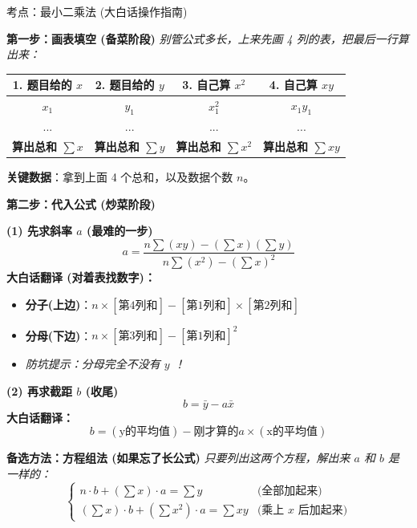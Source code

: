 \documentclass[12pt, a4paper]{article}
\begin{document}
\begin{knowpoint}{考点：最小二乘法 (大白话操作指南)}

    \textbf{第一步：画表填空 (备菜阶段)}
    \textit{别管公式多长，上来先画 4 列的表，把最后一行算出来：}
    
    \begin{center}
    \begin{tabular}{|c|c|c|c|}
    \hline
    \textbf{1. 题目给的 $x$} & \textbf{2. 题目给的 $y$} & \textbf{3. 自己算 $x^2$} & \textbf{4. 自己算 $xy$} \\
    \hline
    $x_1$ & $y_1$ & $x_1^2$ & $x_1 y_1$ \\
    ... & ... & ... & ... \\
    \hline
    \textbf{算出总和 $\sum x$} & \textbf{算出总和 $\sum y$} & \textbf{算出总和 $\sum x^2$} & \textbf{算出总和 $\sum xy$} \\
    \hline
    \end{tabular}
    \end{center}
    \vspace{0.5em}
    \textbf{关键数据}：拿到上面 4 个总和，以及数据个数 $n$。

    \vspace{1.0em}
    \textbf{第二步：代入公式 (炒菜阶段)}
    
    \textbf{(1) 先求斜率 $a$ (最难的一步)}
    \[ a = \frac{n \sum (xy) - (\sum x)(\sum y)}{n \sum (x^2) - (\sum x)^2} \]
    \textbf{大白话翻译 (对着表找数字)：}
    \begin{itemize}
        \item \textbf{分子(上边)}：$n \times [\text{第4列和}] - [\text{第1列和}] \times [\text{第2列和}]$
        \item \textbf{分母(下边)}：$n \times [\text{第3列和}] - [\text{第1列和}]^2$
        \item \textit{防坑提示：分母完全不没有 $y$ ！}
    \end{itemize}

    \vspace{0.5em}
    \textbf{(2) 再求截距 $b$ (收尾)}
    \[ b = \bar{y} - a \bar{x} \]
    \textbf{大白话翻译：}
    \[ b = (\text{y的平均值}) - \text{刚才算的}a \times (\text{x的平均值}) \]
    
    \vspace{1.0em}
    \textbf{备选方法：方程组法 (如果忘了长公式)}
    \textit{只要列出这两个方程，解出来 $a$ 和 $b$ 是一样的：}
    \[
    \begin{cases}
    n \cdot b + (\sum x) \cdot a = \sum y & \text{(全部加起来)} \\
    (\sum x) \cdot b + (\sum x^2) \cdot a = \sum xy & \text{(乘上 $x$ 后加起来)}
    \end{cases}
    \]
\end{knowpoint}
\end{document}
